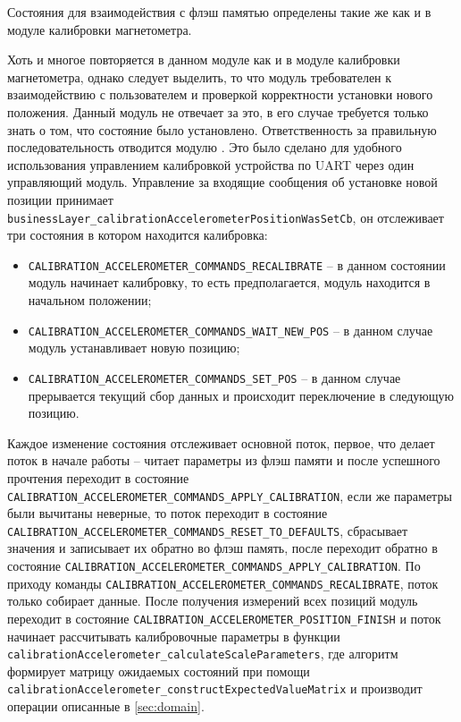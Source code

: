 Состояния для взаимодействия с флэш памятью определены такие же как и в модуле калибровки магнетометра. 

Хоть и многое повторяется в данном модуле как и в модуле калибровки магнетометра, однако следует выделить,
то что модуль требователен к взаимодействию с пользователем и проверкой корректности
установки нового положения. Данный модуль не отвечает за это, в его случае требуется только знать о том, что состояние было установлено. Ответственность
за правильную последовательность отводится модулю \moduleCalibControl . Это было сделано для удобного использования управлением калибровкой устройства по
UART через один управляющий модуль. Управление за входящие сообщения об установке новой позиции принимает \lstinline{businessLayer_calibrationAccelerometerPositionWasSetCb},
он отслеживает три состояния в котором находится калибровка:

\begin{itemize}
    \item \lstinline{CALIBRATION_ACCELEROMETER_COMMANDS_RECALIBRATE} -- в данном состоянии модуль начинает калибровку, то есть предполагается, модуль находится в начальном положении;
    \item \lstinline{CALIBRATION_ACCELEROMETER_COMMANDS_WAIT_NEW_POS} -- в данном случае модуль устанавливает новую позицию;
    \item \lstinline{CALIBRATION_ACCELEROMETER_COMMANDS_SET_POS} -- в данном случае прерывается текущий сбор данных и происходит переключение в следующую позицию.
\end{itemize}


Каждое изменение состояния отслеживает основной поток, первое, что делает поток в начале работы -- читает параметры из флэш памяти и после успешного прочтения переходит в состояние
\lstinline{CALIBRATION_ACCELEROMETER_COMMANDS_APPLY_CALIBRATION}, если же параметры были вычитаны неверные, то поток переходит в состояние
\lstinline{CALIBRATION_ACCELEROMETER_COMMANDS_RESET_TO_DEFAULTS}, сбрасывает значения и записывает их обратно во флэш память, после переходит обратно в состояние
\lstinline{CALIBRATION_ACCELEROMETER_COMMANDS_APPLY_CALIBRATION}. По приходу команды \lstinline{CALIBRATION_ACCELEROMETER_COMMANDS_RECALIBRATE}, поток только
собирает данные.
После получения измерений всех позиций модуль переходит в состояние \lstinline{CALIBRATION_ACCELEROMETER_POSITION_FINISH} и поток начинает рассчитывать калибровочные параметры в функции 
\lstinline{calibrationAccelerometer_calculateScaleParameters}, где алгоритм формирует матрицу ожидаемых состояний при помощи
\lstinline{calibrationAccelerometer_constructExpectedValueMatrix} и производит операции описанные в \ref{sec:domain}.

